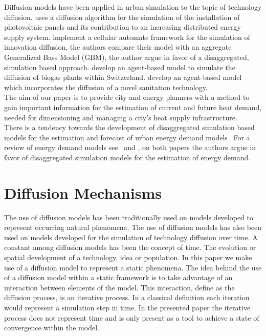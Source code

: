 Diffusion models have been applied in urban simulation to the topic of
technology diffusion. \citet{Linder.2013} uses a diffusion algorithm for the
simulation of the installation of photovoltaic panels and its contribution to
an increasing distributed energy supply system. \citet{Guseo.2008}
implement a cellular automate framework for the simulation of innovation
diffusion, the authors compare their model with an aggregate Generalized Bass
Model (GBM), the author argue in favor of a disaggregated, simulation based
approach.
\citet{Schmid.2008} develop an agent-based model to simulate the diffusion of
biogas plants within Switzerland. \citet{Peters.2002} develop an agent-based
model which incorporates the diffusion of a novel sanitation technology.\\

The aim of our paper is to provide city and energy planners with a method to
gain important information for the estimation of current and future heat
demand, needed for dimensioning and managing a city's  heat supply
infrastructure.\\ 

There is a tendency towards the development of disaggregated simulation based
models for the estimation and forecast of urban energy demand
models~\citep{Balaras.2007, Kavgic.2010, Dascalaki.2010, Dascalaki.2011,
DallO.2012, Caputo.2013, Hrabovszky.2013, Kragh.2013, Singh.2013}
%
For a review of energy demand models see~\citet{Swan.2009} and 
\citet{Keirstead.2012}, on both papers the authors argue in favor of disaggregated
simulation models for the estimation of energy demand.\\
 

\section{Diffusion Mechanisms}

The use of diffusion models has been traditionally used on models developed to
represent occurring natural phenomena.
The use of diffusion models has also been used on models developed for the
simulation of technology diffusion over time. 
%
A constant among diffusion models has been the concept of time. The evolution
or spatial development of a technology, idea or population.
In this paper we make use of a diffusion model to represent a static phenomena.
The idea behind the use of a diffusion model within a static framework is to
take advantage of an interaction between elements of the model.
This interaction, define as the diffusion process, is an iterative process. In
a classical definition each iteration would represent a simulation step in
time.
In the presented paper the iterative process does not represent time and is
only present as a tool to achieve a state of convergence within the model.\\

